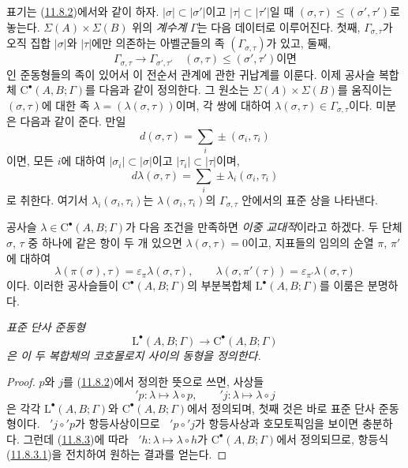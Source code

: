 \begin{env}[11.8.4]
\label{0.11.8.4-fr}
표기는 (\hyperref[0.11.8.2-fr]{11.8.2})에서와 같이 하자.
$|\sigma|\subset|\sigma'|$이고 $|\tau|\subset|\tau'|$일 때
$(\sigma,\tau)\leq(\sigma',\tau')$로 놓는다.
$\Sigma(A)\times\Sigma(B)$ 위의 \emph{계수계} $\Gamma$는 다음 데이터로
이루어진다. 첫째, $\Gamma_{\sigma,\tau}$가 오직 집합 $|\sigma|$와
$|\tau|$에만 의존하는 아벨군들의 족 $(\Gamma_{\sigma,\tau})$가 있고,
둘째,
\[
\Gamma_{\sigma,\tau}\longrightarrow\Gamma_{\sigma',\tau'}
\quad\text{$(\sigma,\tau)\leq(\sigma',\tau')$이면}
\]
인 준동형들의 족이 있어서 이 전순서 관계에 관한 귀납계를 이룬다. 이제
공사슬 복합체 $\mathrm C^\bullet(A,B;\Gamma)$를 다음과 같이 정의한다.
그 원소는 $\Sigma(A)\times\Sigma(B)$를 움직이는
$(\sigma,\tau)$에 대한 족 $\lambda=(\lambda(\sigma,\tau))$이며, 각 쌍에
대하여 $\lambda(\sigma,\tau)\in\Gamma_{\sigma,\tau}$이다. 미분은 다음과
같이 준다. 만일
\[
d(\sigma,\tau)=\sum_i\pm(\sigma_i,\tau_i)
\]
이면, 모든 $i$에 대하여 $|\sigma_i|\subset|\sigma|$이고
$|\tau_i|\subset|\tau|$이며,
\[
d\lambda(\sigma,\tau)=\sum_i\pm\lambda_i(\sigma_i,\tau_i)
\]
로 취한다. 여기서 $\lambda_i(\sigma_i,\tau_i)$는
$\lambda(\sigma_i,\tau_i)$의 $\Gamma_{\sigma,\tau}$ 안에서의 표준 상을
나타낸다.

공사슬 $\lambda\in\mathrm C^\bullet(A,B;\Gamma)$가 다음 조건을 만족하면
\emph{이중 교대적}이라고 하겠다. 두 단체 $\sigma$, $\tau$ 중 하나에
같은 항이 두 개 있으면 $\lambda(\sigma,\tau)=0$이고, 지표들의 임의의
순열 $\pi$, $\pi'$에 대하여
\[
\lambda(\pi(\sigma),\tau)=\varepsilon_\pi\lambda(\sigma,\tau),
\qquad
\lambda(\sigma,\pi'(\tau))=\varepsilon_{\pi'}\lambda(\sigma,\tau)
\]
이다. 이러한 공사슬들이 $\mathrm C^\bullet(A,B;\Gamma)$의 부분복합체
$\mathrm L^\bullet(A,B;\Gamma)$를 이룸은 분명하다.
\end{env}

\begin{proposition}[11.8.5]
\label{0.11.8.5-fr}
\emph{표준 단사 준동형
\[
\mathrm L^\bullet(A,B;\Gamma)\longrightarrow
\mathrm C^\bullet(A,B;\Gamma)
\]
은 이 두 복합체의 코호몰로지 사이의 동형을 정의한다.}
\end{proposition}

\begin{proof}
$p$와 $j$를 (\hyperref[0.11.8.2-fr]{11.8.2})에서 정의한 뜻으로 쓰면,
사상들
\[
{}'p:\lambda\longmapsto\lambda\circ p,\qquad
{}'j:\lambda\longmapsto\lambda\circ j
\]
은 각각 $\mathrm L^\bullet(A,B;\Gamma)$와
$\mathrm C^\bullet(A,B;\Gamma)$에서 정의되며, 첫째 것은 바로 표준 단사
준동형이다. $\mathop{}'j\circ{}'p$가 항등사상이므로
$\mathop{}'p\circ{}'j$가 항등사상과 호모토픽임을 보이면 충분하다. 그런데
(\hyperref[0.11.8.3-fr]{11.8.3})에 따라
$\mathop{}'h:\lambda\mapsto\lambda\circ h$가
$\mathrm C^\bullet(A,B;\Gamma)$에서 정의되므로, 항등식
(\hyperref[0.11.8.3.1-fr]{11.8.3.1})을 전치하여 원하는 결과를 얻는다.
\end{proof}

